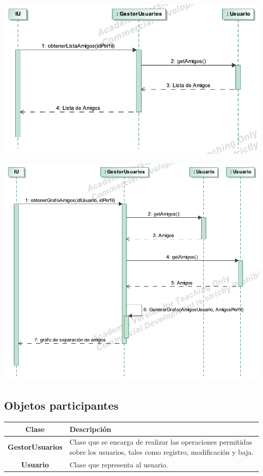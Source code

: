 \documentclass[12pt, a4paper, titlepage]{article}
\begin{document}
\begin{center}
	\includegraphics{Imagenes/OperacionObtenerListaAmigos}
\end{center}

\begin{center}
	\includegraphics{Imagenes/OperacionObtenerGrafoAmigos}
\end{center}

\subsection{Objetos participantes}

\begin{center}
\begin{tabular}{|c|p{14cm}|}
	\hline
	\textbf{Clase} & \textbf{Descripción}\\ \hline
	\textbf{GestorUsuarios} &  Clase que se encarga de realizar las operaciones permitidas sobre los usuarios, tales como registro, modificación y baja.\\ \hline
	\textbf{Usuario} & Clase que representa al usuario. \\ \hline
\end{tabular}

\end{center}
\end{document}
